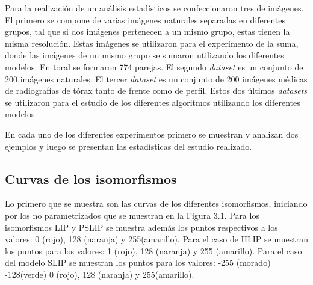Para la realizaci\'on de un an\'alisis estad\'isticos se confeccionaron tres  de im\'agenes. El primero se compone de varias im\'agenes naturales separadas en diferentes grupos, tal que si dos im\'agenes pertenecen a un mismo grupo, estas tienen la misma resoluci\'on. Estas im\'agenes se utilizaron para el experimento de la suma, donde las im\'agenes de un mismo grupo se sumaron utilizando los diferentes modelos. En toral se formaron 774 parejas. El segundo \textit{dataset} es un conjunto de 200 im\'agenes naturales. El tercer \textit{dataset} es un conjunto de 200 im\'agenes m\'edicas de radiograf\'ias de t\'orax tanto de frente como de perfil. Estos dos \'ultimos \textit{datasets} se utilizaron para el estudio de los diferentes algoritmos utilizando los diferentes modelos.

En cada uno de los diferentes experimentos primero se muestran y analizan dos ejemplos y luego se presentan las estad\'isticas del estudio realizado.

\subsection{Curvas de los isomorfismos}
Lo primero que se muestra son las curvas de los diferentes isomorfismos, iniciando por los no parametrizados que se muestran en la Figura 3.1. Para los isomorfismos LIP y PSLIP se muestra adem\'as los puntos respectivos a los valores: 0 (rojo), 128 (naranja) y 255(amarillo). Para el caso de HLIP se muestran los puntos para los valores: 1 (rojo), 128 (naranja) y 255 (amarillo). Para el caso del modelo SLIP se muestran los puntos para los valores: -255 (morado) -128(verde) 0 (rojo), 128 (naranja) y 255(amarillo).

